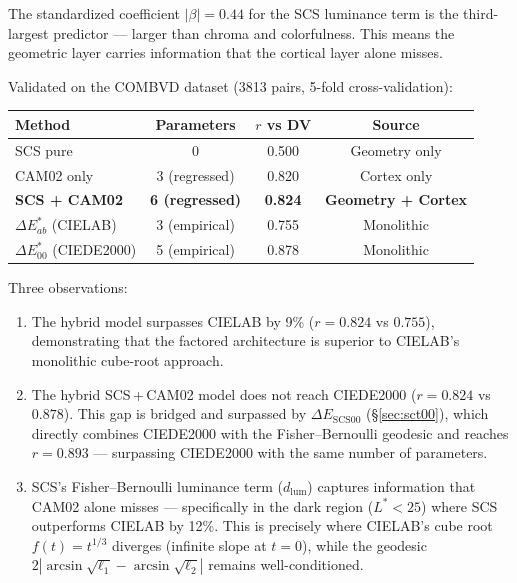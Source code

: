 \documentclass[12pt,a4paper]{article}
\begin{document}
The standardized coefficient $|\beta| = 0.44$ for the SCS luminance
term is the third-largest predictor --- larger than chroma and
colorfulness. This means the geometric layer carries information
that the cortical layer alone misses.

Validated on the COMBVD dataset (3813 pairs, 5-fold cross-validation):

\begin{center}
\begin{tabular}{lccc}
\toprule
Method & Parameters & $r$ vs DV & Source \\
\midrule
SCS pure & 0 & 0.500 & Geometry only \\
CAM02 only & 3 (regressed) & 0.820 & Cortex only \\
\textbf{SCS + CAM02} & \textbf{6 (regressed)} & \textbf{0.824} & \textbf{Geometry + Cortex} \\
$\Delta E^*_{ab}$ (CIELAB) & 3 (empirical) & 0.755 & Monolithic \\
$\Delta E^*_{00}$ (CIEDE2000) & 5 (empirical) & 0.878 & Monolithic \\
\bottomrule
\end{tabular}
\end{center}

Three observations:

\begin{enumerate}[nosep]
\item The hybrid model surpasses CIELAB by 9\% ($r = 0.824$ vs
  $0.755$), demonstrating that the factored architecture is superior
  to CIELAB's monolithic cube-root approach.
\item The hybrid SCS\,+\,CAM02 model does not reach CIEDE2000
  ($r = 0.824$ vs $0.878$). This gap is bridged and surpassed by
  $\Delta E_{\mathrm{SCS00}}$ (\S\ref{sec:sct00}), which directly
  combines CIEDE2000 with the Fisher--Bernoulli geodesic and reaches
  $r = 0.893$ --- surpassing CIEDE2000 with the same number of
  parameters.
\item SCS's Fisher--Bernoulli luminance term ($d_{\mathrm{lum}}$)
  captures information that CAM02 alone misses --- specifically in
  the dark region ($L^* < 25$) where SCS outperforms CIELAB by 12\%.
  This is precisely where CIELAB's cube root $f(t) = t^{1/3}$
  diverges (infinite slope at $t = 0$), while the geodesic
  $2|\arcsin\sqrt{\ell_1} - \arcsin\sqrt{\ell_2}|$ remains
  well-conditioned.
\end{enumerate}
\end{document}
